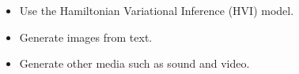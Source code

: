 \documentclass[landscape,a0b,final,a4resizeable]{include/a0poster}
\begin{document}
\begin{poster}
\begin{multicols}{3}
\vspace{1.cm}
	\begin{itemize}
		\setlength\itemsep{0.4em}
		\item Use the Hamiltonian Variational Inference (HVI) model.
		\item Generate images from text.
		\item Generate other media such as sound and video.
 	\end{itemize}


		

\vspace{1.cm}

\small
\begingroup
\renewcommand{\section}[2]{}%

\endgroup



\end{multicols}
\end{poster}
\end{document}
